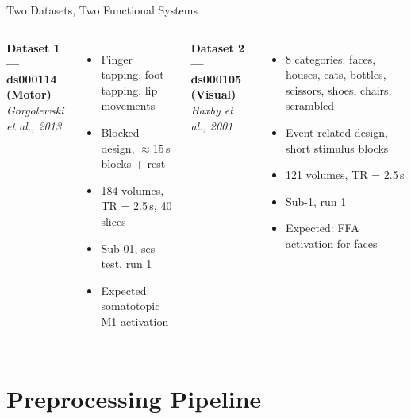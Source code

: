 \documentclass[aspectratio=169]{beamer}
\begin{document}
\begin{frame}{Two Datasets, Two Functional Systems}
  \begin{columns}
      \textbf{Dataset 1 --- ds000114 (Motor)}\\[0.2em]
      \textit{Gorgolewski et al., 2013}\\[0.3em]
      \begin{itemize}
        \item Finger tapping, foot tapping, lip movements
        \item Blocked design, $\approx$15\,s blocks + rest
        \item 184 volumes, TR = 2.5\,s, 40 slices
        \item Sub-01, ses-test, run 1
        \item Expected: somatotopic M1 activation
      \end{itemize}
      \textbf{Dataset 2 --- ds000105 (Visual)}\\[0.2em]
      \textit{Haxby et al., 2001}\\[0.3em]
      \begin{itemize}
        \item 8 categories: faces, houses, cats, bottles, scissors, shoes, chairs, scrambled
        \item Event-related design, short stimulus blocks
        \item 121 volumes, TR = 2.5\,s
        \item Sub-1, run 1
        \item Expected: FFA activation for faces
      \end{itemize}
  \end{columns}
\end{frame}

\section{Preprocessing Pipeline}
\end{document}

